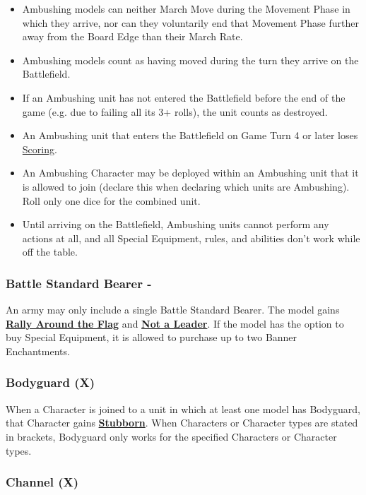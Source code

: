 \begin{itemize}[label={-}]
\item Ambushing models can neither March Move during the Movement Phase in which they arrive, nor can they voluntarily end that Movement Phase further away from the Board Edge than their March Rate.
\item Ambushing models count as having moved during the turn they arrive on the Battlefield.
\item If an Ambushing unit has not entered the Battlefield before the end of the game (e.g. due to failing all its 3+ rolls), the unit counts as destroyed.
\item An Ambushing unit that enters the Battlefield on Game Turn 4 or later loses \hyperref[scoring]{Scoring}.
\item An Ambushing Character may be deployed within an Ambushing unit that it is allowed to join (declare this when declaring which units are Ambushing). Roll only one dice for the combined unit.
\item Until arriving on the Battlefield, Ambushing units cannot perform any actions at all, and all Special Equipment, rules, and abilities don't work while off the table.
\end{itemize}

\subsubsection{Battle Standard Bearer - \oneofakind{}}
\label{bsb}

An army may only include a single Battle Standard Bearer. The model gains \hyperref[rally_around_the_flag]{\textbf{Rally Around the Flag}} and \hyperref[not_a_leader]{\textbf{Not a Leader}}. If the model has the option to buy Special Equipment, it is allowed to purchase up to two Banner Enchantments.

\subsubsection{Bodyguard (X)}
\label{bodyguard}

When a Character is joined to a unit in which at least one model has Bodyguard, that Character gains \hyperref[stubborn]{\textbf{Stubborn}}. When Characters or Character types are stated in brackets, Bodyguard only works for the specified Characters or Character types.

\subsubsection{Channel (X)}
\label{channel}

